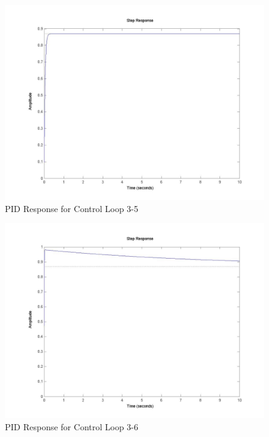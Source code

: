 	\begin{figure}[H]
		\includegraphics[width=\textwidth]{part3-5.jpg}
		\caption{PID Response for Control Loop 3-5}
	\end{figure}
	
	\begin{figure}[H]
		\includegraphics[width=\textwidth]{part3-6.jpg}
		\caption{PID Response for Control Loop 3-6}
	\end{figure}
	
